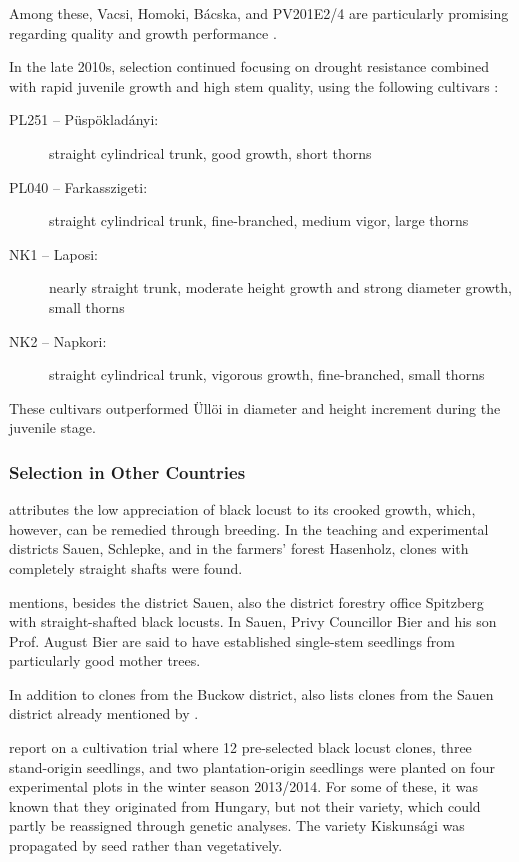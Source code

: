 Among these, Vacsi, Homoki, Bácska, and PV201E2/4 are particularly promising regarding quality and growth performance \citep{redei2018robinieImprovement,keserue2021robinie,abri2023robinieUngarn,abri2024dis}.

In the late 2010s, selection continued focusing on drought resistance combined with rapid juvenile growth and high stem quality, using the following cultivars \citep{abri2023robinieUngarn,abri2024dis}:

\begin{description}
  \item[PL251 -- Püspökladányi:] straight cylindrical trunk, good growth, short thorns
  \item[PL040 -- Farkasszigeti:] straight cylindrical trunk, fine-branched, medium vigor, large thorns
  \item[NK1 -- Laposi:] nearly straight trunk, moderate height growth and strong diameter growth, small thorns
  \item[NK2 -- Napkori:] straight cylindrical trunk, vigorous growth, fine-branched, small thorns
\end{description}

These cultivars outperformed Üllöi in diameter and height increment during the juvenile stage.

\subsubsection{Selection in Other Countries}

\citet{schroeck1953robine} attributes the low appreciation of black locust
to its crooked growth, which, however, can be remedied through breeding.
In the teaching and experimental districts Sauen, Schlepke, and in the
farmers' forest Hasenholz, clones with completely straight shafts were found.

\citet{erteld1952robinieErtrag} mentions, besides the district Sauen, also
the district forestry office Spitzberg with straight-shafted black locusts.
In Sauen, Privy Councillor Bier and his son Prof. August Bier are said to have
established single-stem seedlings from particularly good mother trees.

In addition to clones from the Buckow district, \citet{naujoks2005robinie}
also lists clones from the Sauen district already mentioned by
\citet{schroeck1953robine}.

\citet{naujoks2005robinie,hofmann2020robinie,lange2021robinie,lange2022robinie}
report on a cultivation trial where 12 pre-selected black locust clones,
three stand-origin seedlings, and two plantation-origin seedlings were planted
on four experimental plots in the winter season 2013/2014. For some of these,
it was known that they originated from Hungary, but not their variety, which
could partly be reassigned through genetic analyses. The variety Kiskunsági
was propagated by seed rather than vegetatively.

